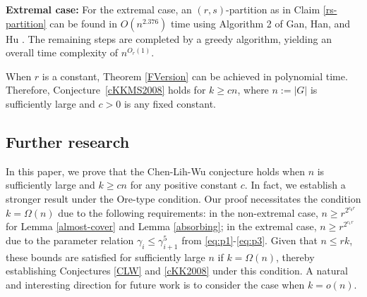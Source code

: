 \documentclass[11pt, a4paper]{article}
\theoremstyle{definition}
\newcommand{\<}{\subseteq}
\begin{document}
\medskip
\textbf{Extremal case:} For the extremal case, an $(r,s)$-partition as in Claim \ref{rs-partition} can be found in $O(n^{2.376})$ time using Algorithm 2 of Gan, Han, and Hu \cite{GHH2024}. The remaining steps are completed by a greedy algorithm, yielding an overall time complexity of $n^{O_r(1)}$.%

When $r$ is a constant, Theorem \ref{FVersion} can be achieved in polynomial time. Therefore, Conjecture~\ref{cKKMS2008} holds for $k \ge c n$, where $n:=|G|$ is sufficiently large and $c > 0$ is any fixed constant.

\subsection{Further research}

In this paper, we prove that the Chen-Lih-Wu conjecture holds when $n$ is sufficiently large and $k\ge cn$ for any positive constant $c$. In fact, we establish a stronger result under the Ore-type condition. Our proof necessitates the condition $k = \Omega(n)$ due to the following requirements: in the non-extremal case, $n \ge r^{2^{c_0 r}}$ for Lemma \ref{almost-cover} and Lemma \ref{absorbing}; in the extremal case, $n \ge r^{2^{c_1 r}}$ due to the parameter relation $\gamma_i \le \gamma_{i+1}^5$ from \eqref{eq:p1}-\eqref{eq:p3}. Given that $n \le rk$, these bounds are satisfied for sufficiently large $n$ if $k = \Omega(n)$, thereby establishing Conjectures \ref{CLW} and \ref{cKK2008} under this condition.  A natural and interesting direction for future work is to consider the case when $k = o(n)$. %




\end{document}
